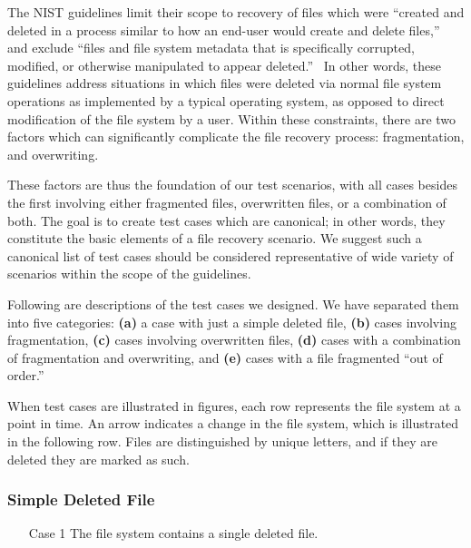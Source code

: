 The NIST guidelines limit their scope to recovery of files which were ``created and deleted in a process similar to 
how an end-user would create and delete files,''~\cite{meta:dfr:standards} and exclude 
``files and file system metadata that is specifically corrupted, modified, or otherwise manipulated to appear deleted.''~\cite{meta:dfr:standards}
In other words, these guidelines address situations in which files were deleted via normal file system operations as 
implemented by a typical operating system, as opposed to direct modification of the file system by a user.
Within these constraints, there are two factors which can significantly complicate the file recovery process: 
fragmentation, and overwriting. 

These factors are thus the foundation of our test scenarios, with all cases besides the first involving either fragmented files, overwritten files, or a combination of both. 
The goal is to create test cases which are canonical; in other words, they constitute the basic elements of a file recovery scenario.
We suggest such a canonical list of test cases should be considered representative of wide variety of scenarios within the scope of the guidelines.

Following are descriptions of the test cases we designed. 
We have separated them into five categories: 
{\bf(a)} a case with just a simple deleted file, 
{\bf (b)} cases involving fragmentation,
{\bf (c)} cases involving overwritten files,
{\bf (d)} cases with a combination of fragmentation and overwriting,
and {\bf (e)} cases with a file fragmented ``out of order.''

When test cases are illustrated in figures, each row represents the file system at a point in time. An arrow indicates a change in the file system, which is illustrated in the following row. Files are distinguished by unique letters, and if they are deleted they are marked as such.
\subsubsection{Simple Deleted File}
\begin{itemize}[align=parleft, labelwidth=4em, leftmargin =\dimexpr{}+\relax]
    \item [Case 1] The file system contains a single deleted file.
\end{itemize}
